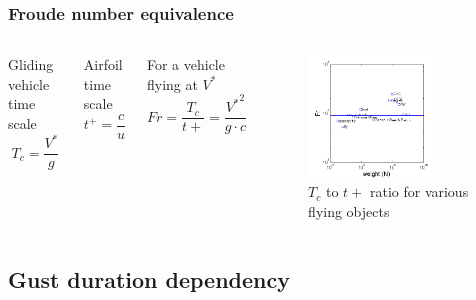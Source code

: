 \documentclass[compress]{beamer}
\begin{document}
\begin{frame}
  \frametitle{Froude number equivalence}
  \begin{columns}
    Gliding vehicle time scale
    \begin{equation*}
      T_c=\frac{V^*}{g}
    \end{equation*}

    Airfoil time scale
    \begin{equation*}
      t^+=\frac{c}{u}
    \end{equation*}

    For a vehicle flying at $V^*$
    \begin{equation*}
      Fr=\frac{T_c}{t+}=\frac{{V^*}^2}{g \cdot c}
      \label{eqn:T_t+_ratio}
    \end{equation*}

    \begin{figure}[h]
      \begin{center}
	\includegraphics[width=0.8\textwidth]{./Figures/froude.png}
      \end{center}
      \caption{$T_c$ to $t+$ ratio for various flying objects}
    \end{figure}
  \end{columns}
\end{frame}
\subsection{Gust duration dependency}
\end{document}
